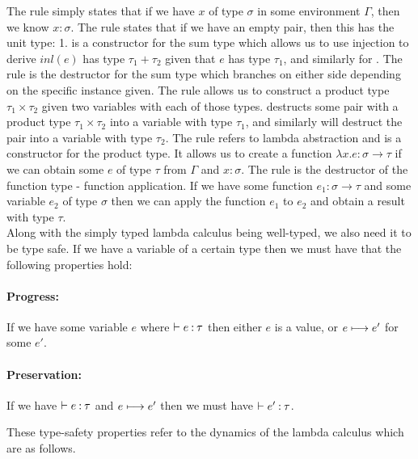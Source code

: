 The  rule simply states that if we have $x$ of type $\sigma$ in some environment $\Gamma$, 
then we know $x: \sigma$. The  rule states that if we have an empty pair, then this has 
the unit type: 1.  is a constructor for the sum type which allows us to use injection 
to derive $inl(e)$ has type $\tau_1 + \tau_2$ given that $e$ has type $\tau_1$, and similarly for 
. The  rule is the destructor for the sum type which branches on either
side depending on the specific instance given. %
The  rule allows us to construct a product type $\tau_1 \times \tau_2$ given two variables
with each of those types.  destructs some pair with a product type $\tau_1 \times \tau_2$ 
into a variable with type $\tau_1$, and similarly  will destruct the pair into a variable 
with type $\tau_2$. 
The  rule refers to lambda abstraction and is a constructor for the product type. It allows
us to create a function $\lambda x. e : \sigma \rightarrow \tau$ if we can obtain some $e$ of type $\tau$
from $\Gamma$ and $x: \sigma$. The  rule is the destructor of the function type - function 
application. If we have some function $e_1: \sigma \rightarrow \tau$ and some variable $e_2$ of type 
$\sigma$ then we can apply the function $e_1$ to $e_2$ and obtain a result with type $\tau$.
\\
\noindent
Along with the simply typed lambda calculus being well-typed, we also need it to be type safe. If we 
have a variable of a certain type then we must have that the following properties hold:

\paragraph{Progress:} If we have some variable $e$ where $\vdash e\mathbin{:}\tau$ then either $e$ is a 
value, or $e \longmapsto e'$ for some $e'$.
\noindent
\paragraph{Preservation:} If we have $\vdash e\mathbin{:}\tau$ and $e \longmapsto e'$ then we must have 
$\vdash e'\mathbin{:}\tau$.

\noindent
These type-safety properties refer to the dynamics of the lambda calculus which are as follows.

